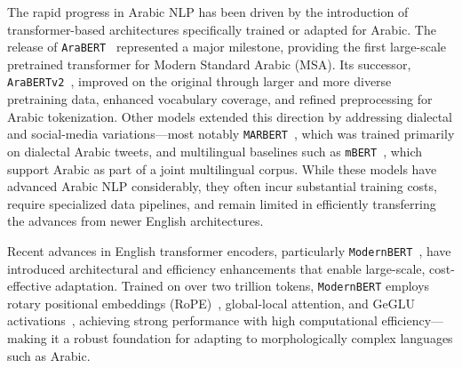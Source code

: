 \documentclass[11pt]{article}
\begin{document}
The rapid progress in Arabic NLP has been driven by the introduction of transformer-based architectures specifically trained or adapted for Arabic. The release of \texttt{AraBERT}~\cite{antoun2020arabert} represented a major milestone, providing the first large-scale pretrained transformer for Modern Standard Arabic (MSA). Its successor, \texttt{AraBERTv2}~\cite{antoun2020arabert}, improved on the original through larger and more diverse pretraining data, enhanced vocabulary coverage, and refined preprocessing for Arabic tokenization. Other models extended this direction by addressing dialectal and social-media variations—most notably \texttt{MARBERT}~\cite{abdul-mageed-etal-2021-arbert}, which was trained primarily on dialectal Arabic tweets, and multilingual baselines such as \texttt{mBERT}~\cite{devlin-etal-2019-bert}, which support Arabic as part of a joint multilingual corpus. While these models have advanced Arabic NLP considerably, they often incur substantial training costs, require specialized data pipelines, and remain limited in efficiently transferring the advances from newer English architectures.

Recent advances in English transformer encoders, particularly \texttt{ModernBERT}~\cite{warner2024modernbert}, have introduced architectural and efficiency enhancements that enable large-scale, cost-effective adaptation. Trained on over two trillion tokens, \texttt{ModernBERT} employs rotary positional embeddings (RoPE)~\cite{su2024roformer}, global-local attention, and GeGLU activations~\cite{shazeer2020glu}, achieving strong performance with high computational efficiency—making it a robust foundation for adapting to morphologically complex languages such as Arabic.


  
\end{document}
